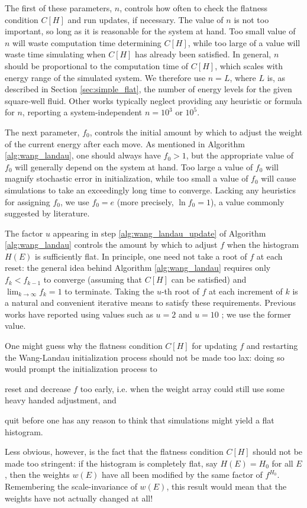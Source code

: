 \documentclass[11pt]{article}
\newcommand{\p}[1]{\left(#1\right)} %
\renewcommand{\sp}[1]{\left[#1\right]} %
\begin{document}
The first of these parameters, $n$, controls how often to check the
flatness condition $C\sp{H}$ and run updates, if necessary. The value
of $n$ is not too important, so long as it is reasonable for the
system at hand. Too small value of $n$ will waste computation time
determining $C\sp{H}$, while too large of a value will waste time
simulating when $C\sp{H}$ has already been satisfied. In general, $n$
should be proportional to the computation time of $C\sp{H}$, which
scales with energy range of the simulated system. We therefore use
$n=L$, where $L$ is, as described in Section \ref{sec:simple_flat},
the number of energy levels for the given square-well fluid. Other
works typically neglect providing any heuristic or formula for $n$,
reporting a system-independent $n=10^3$\cite{belardinelli2007fast} or
$10^5$\cite{wang2001determining}.

The next parameter, $f_0$, controls the initial amount by which to
adjust the weight of the current energy after each move. As mentioned
in Algorithm \ref{alg:wang_landau}, one should always have $f_0>1$,
but the appropriate value of $f_0$ will generally depend on the system
at hand. Too large a value of $f_0$ will magnify stochastic error in
initialization, while too small a value of $f_0$ will cause
simulations to take an exceedingly long time to converge. Lacking any
heuristics for assigning $f_0$, we use $f_0=e$ (more precisely, $\ln
f_0=1$), a value commonly suggested by
literature\cite{wang2001determining}.

The factor $u$ appearing in step \ref{alg:wang_landau_update} of
Algorithm \ref{alg:wang_landau} controls the amount by which to adjust
$f$ when the histogram $H\p{E}$ is sufficiently flat. In principle,
one need not take a root of $f$ at each reset: the general idea behind
Algorithm \ref{alg:wang_landau} requires only $f_k<f_{k-1}$ to
converge (assuming that $C\sp{H}$ can be satisfied) and
$\lim_{k\to\infty}f_k=1$ to terminate. Taking the $u$-th root of $f$
at each increment of $k$ is a natural and convenient iterative means
to satisfy these requirements. Previous works have reported using
values such as $u=2$ \cite{wang2001determining, belardinelli2007fast}
and $u=10$ \cite{zhou2005understanding}; we use the former value.

One might guess why the flatness condition $C\sp{H}$ for updating $f$
and restarting the Wang-Landau initialization process should not be
made too lax: doing so would prompt the initialization process to
\begin{enumerate*}[label=\roman*)]
\item reset and decrease $f$ too early, i.e. when the weight array
  could still use some heavy handed adjustment, and
\item quit before one has any reason to think that simulations might
  yield a flat histogram.
\end{enumerate*}
Less obvious, however, is the fact that the flatness condition
$C\sp{H}$ should not be made too stringent: if the histogram is
completely flat, say $H\p{E}=H_0$ for all $E$, then the weights
$w\p{E}$ have all been modified by the same factor of $f^{H_0}$.
Remembering the scale-invariance of $w\p{E}$, this result would mean
that the weights have not actually changed at all!
\end{document}

